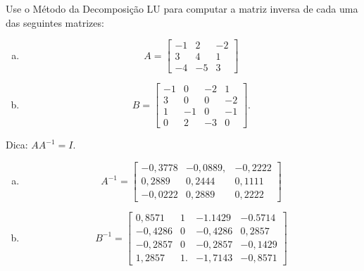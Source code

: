 \begin{exer}
  Use o Método da Decomposição LU para computar a matriz inversa de cada uma das seguintes matrizes:
  \begin{enumerate}[a)]
  \item
  \begin{equation}
    A =
    \begin{bmatrix}
      -1 & 2 & -2\\
      3 & 4 & 1\\
      -4 & -5 & 3
    \end{bmatrix}
  \end{equation}
\item
  \begin{equation}
    B =
    \begin{bmatrix}
      -1 & 0 & -2 & 1\\
      3 & 0 & 0 & -2\\
      1 & -1 & 0 & -1\\
      0 & 2 & -3 & 0
    \end{bmatrix}.
  \end{equation}  
\end{enumerate}
\end{exer}
\begin{resp}
  Dica: $AA^{-1} = I$.
  \begin{enumerate}[a)]
  \item
    \begin{equation}
      A^{-1} =
      \begin{bmatrix}
        -0,3778 & -0,0889, & -0,2222\\
         0,2889 & 0,2444  & 0,1111\\
         -0,0222 & 0,2889 & 0,2222
      \end{bmatrix}
    \end{equation}
  \item
    \begin{equation}
      B^{-1} =
      \begin{bmatrix}
        0,8571  & 1 & -1.1429 & -0.5714\\
        -0,4286 & 0 & -0,4286 & 0,2857\\
        -0,2857 & 0 & -0,2857 & -0,1429\\
        1,2857 &  1. &-1,7143 & -0,8571
      \end{bmatrix}
    \end{equation}
  \end{enumerate}
\end{resp}


